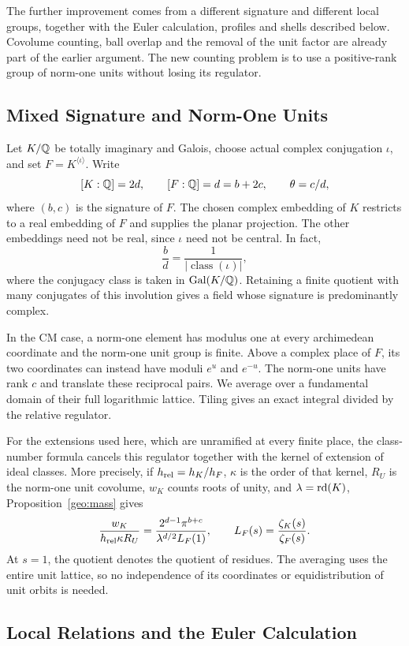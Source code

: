 The further improvement comes from a different signature and different
local groups, together with the Euler calculation, profiles and shells
described below. Covolume counting, ball overlap and the
removal of the unit factor are already part of the earlier argument.
The new counting problem is to use a positive-rank group of norm-one
units without losing its regulator.

\subsection{Mixed Signature and Norm-One Units}

Let $K/\mathbb Q$ be totally imaginary and Galois, choose actual complex
conjugation $\iota$, and set $F=K^{\langle\iota\rangle}$. Write
\[
 [K:\mathbb Q]=2d,\qquad [F:\mathbb Q]=d=b+2c,\qquad \theta=c/d,
\]
where $(b,c)$ is the signature of $F$. The chosen complex embedding of
$K$ restricts to a real embedding of $F$ and supplies the planar
projection. The other embeddings
need not be real, since $\iota$ need not be central. In fact,
\[
 \frac bd=\frac1{|\operatorname{class}(\iota)|},
\]
where the conjugacy class is taken in $\operatorname{Gal}(K/\mathbb Q)$. Retaining a finite
quotient with many conjugates of this involution gives a field whose
signature is predominantly complex.

In the CM case, a norm-one element has modulus one at every
archimedean coordinate and the norm-one unit group is finite.
Above a complex place of $F$, its two coordinates can instead have
moduli $e^u$ and $e^{-u}$. The norm-one units have rank $c$ and
translate these reciprocal pairs. We average over a fundamental
domain of their full logarithmic lattice. Tiling gives an exact
integral divided by the relative regulator.

For the extensions used here, which are unramified at every finite
place, the class-number formula cancels this regulator together with
the kernel of extension of ideal classes. More precisely, if
$h_{\rm rel}=h_K/h_F$, $\kappa$ is the order of that kernel,
$R_U$ is the norm-one unit covolume, $w_K$ counts roots of unity, and
$\lambda=\operatorname{rd}(K)$, Proposition~\ref{geo:mass} gives
\[
 \frac{w_K}{h_{\rm rel}\kappa R_U}
 =\frac{2^{d-1}\pi^{b+c}}{\lambda^{d/2}L_F(1)},
 \qquad L_F(s)=\frac{\zeta_K(s)}{\zeta_F(s)}.
\]
At $s=1$, the quotient denotes the quotient of residues.
The averaging uses the entire unit lattice, so no independence of
its coordinates or equidistribution of unit orbits is needed.

\subsection{Local Relations and the Euler Calculation}
\label{intro:local}

